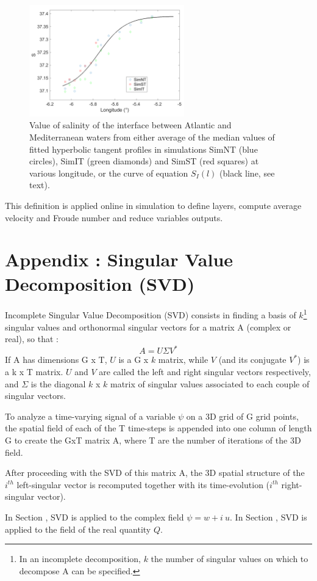 \begin{figure}[!h]
 \centering
 \includegraphics[width=0.6\textwidth]{./GBR3D/salinite_interface_papier.png}
 \caption [Value of salinity of the interface between Atlantic and Mediterranean waters]{Value of salinity of the interface between Atlantic and Mediterranean waters from either average of the median values of fitted hyperbolic tangent profiles in simulations SimNT (blue circles), SimIT (green diamonds) and SimST (red squares) at various longitude, or the curve of equation $S_I(l)$ (black line, see text).}
 \label{fig_defintf}
\end{figure}

This definition is applied online in simulation to define layers, compute average velocity and Froude number and reduce variables outputs.
\color{black}

\section{Appendix : Singular Value Decomposition (SVD)}
\label{annexeSVD}
Incomplete Singular Value Decomposition (SVD) consists in finding a basis of $k$\footnote{In an incomplete decomposition, $k$ the number of singular values on which to decompose A can be specified.} singular values and orthonormal singular vectors for a matrix A (complex or real), so that :
\begin{equation}
A = U \Sigma V^* 
\end{equation}
If A has dimensions G x T, $U$ is a G x $k$ matrix, while $V$ (and its conjugate $V^*$) is a k x T matrix. $U$ and $V$ are called the left and right singular vectors respectively, and $\Sigma$ is the diagonal $k$ x $k$ matrix of singular values associated to each couple of singular vectors.

To analyze a time-varying signal of a variable $\psi$ on a 3D grid of G grid points, the spatial field of each of the T time-steps is appended into one column of length G to create the GxT matrix A, where T are the number of iterations of the 3D field. 

After proceeding with the SVD of this matrix A, the 3D spatial structure of the $i^{th}$ left-singular vector is recomputed together with its time-evolution ($i^{th}$ right-singular vector).

In Section , SVD is applied to the complex field $\psi=w+i\ u$. %
In Section , SVD is applied to the field of the real quantity $Q$.
